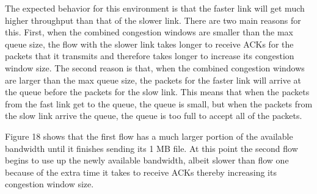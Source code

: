 \documentclass[11pt]{article}
\begin{document}
The expected behavior for this environment is that the faster link will get much higher throughput than that of the slower link. There are two main reasons for this. First, when the combined congestion windows are smaller than the max queue size, the flow with the slower link takes longer to receive ACKs for the packets that it transmits and therefore takes longer to increase its congestion window size. The second reason is that, when the combined congestion windows are larger than the max queue size, the packets for the faster link will arrive at the queue before the packets for the slow link. This means that when the packets from the fast link get to the queue, the queue is small, but when the packets from the slow link arrive the queue, the queue is too full to accept all of the packets.

Figure 18 shows that the first flow has a much larger portion of the available bandwidth until it finishes sending its 1 MB file. At this point the second flow begins to use up the newly available bandwidth, albeit slower than flow one because of the extra time it takes to receive ACKs thereby increasing its congestion window size.
\end{document}
